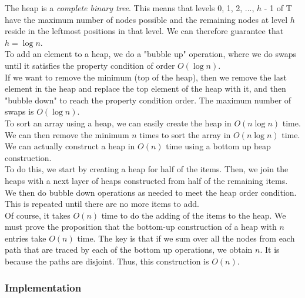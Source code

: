 \documentclass[]{article}
\begin{document}

The heap is a \textit{complete binary tree}. This means that levels 0, 1, 2, ..., $h$ - 1 of T have the maximum number of nodes possible and the remaining nodes at level $h$ reside in the leftmost positions in that level. We can therefore guarantee that $h = \log n$.\\


To add an element to a heap, we do a "bubble up" operation, where we do swaps until it satisfies the property condition of order $O(\log n)$.\\

If we want to remove the minimum (top of the heap), then we remove the last element in the heap and replace the top element of the heap with it, and then "bubble down" to reach the property condition order. The maximum number of swaps is $O(\log n)$.\\

To sort an array using a heap, we can easily create the heap in $O(n \log n)$ time. We can then remove the minimum $n$ times to sort the array in $O(n \log n)$ time.\\

We can actually construct a heap in $O(n)$ time using a bottom up heap construction.\\

To do this, we start by creating a heap for half of the items. Then, we join the heaps with a next layer of heaps constructed from half of the remaining items. We then do bubble down operations as needed to meet the heap order condition. This is repeated until there are no more items to add.\\

Of course, it takes $O(n)$ time to do the adding of the items to the heap. We must prove the proposition that the bottom-up construction of a heap with $n$ entries take $O(n)$ time. The key is that if we sum over all the nodes from each path that are traced by each of the bottom up operations, we obtain $n$. It is because the paths are disjoint. Thus, this construction is $O(n)$.\\

\subsubsection{Implementation}\bigbreak
\end{document}
